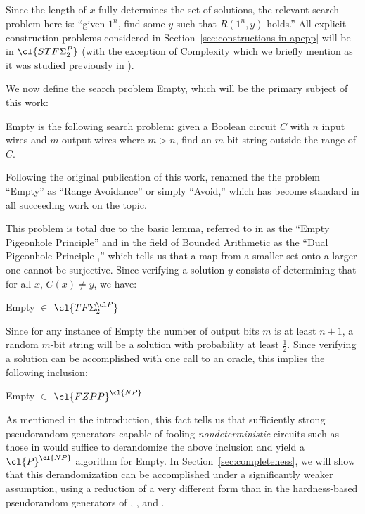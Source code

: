 Since the length of $x$ fully determines the set of solutions, the relevant search problem here is: ``given $1^n$, find some $y$ such that $R(1^n,y)$ holds.'' All explicit construction problems considered in Section~\ref{sec:constructions-in-apepp} will be in $\cl{STF\Sigma_2^P}$ (with the exception of {\sc Complexity} which we briefly mention as it was studied previously in \cite{total}).

We now define the search problem {\sc Empty}, which will be the primary subject of this work:
\begin{definition}
{\sc Empty} is the following search problem: given a Boolean circuit $C$ with $n$ input wires and $m$ output wires where $m>n$, find an $m$-bit string outside the range of $C$.
\end{definition}

Following the original publication of this work, \cite{RSW} renamed the the problem ``{\sc Empty}'' as ``{\sc Range Avoidance}'' or simply ``{\sc Avoid},'' which has become standard in all succeeding work on the topic.

This problem is total due to the basic lemma, referred to in \cite{total} as the ``Empty Pigeonhole Principle'' and in the field of Bounded Arithmetic as the ``Dual Pigeonhole Principle \cite{Jerabek},'' which tells us that a map from a smaller set onto a larger one cannot be surjective. Since verifying a solution $y$ consists of determining that for all $x$, $C(x) \neq y$, we have:
\begin{observation}
{\sc Empty} $\in$ $\cl{TF\Sigma^{\cl P}_2}$
\end{observation}

Since for any instance of {\sc Empty} the number of output bits $m$ is at least $n+1$, a random $m$-bit string will be a solution with probability at least $\frac{1}{2}$. Since verifying a solution can be accomplished with one call to an  oracle, this implies the following inclusion:

\begin{observation}
{\sc Empty} $\in$ $\cl{FZPP}^\cl{NP}$
\end{observation}

As mentioned in the introduction, this fact tells us that sufficiently strong pseudorandom generators capable of fooling \emph{nondeterministic} circuits such as those in \cite{AM-derandomization} would suffice to derandomize the above inclusion and yield a $\cl{P}^\cl{NP}$ algorithm for {\sc Empty}. In Section~\ref{sec:completeness}, we will show that this derandomization can be accomplished under a significantly weaker assumption, using a reduction of a very different form than in the hardness-based pseudorandom generators of \cite{NW}, \cite{IW}, and \cite{AM-derandomization}.

